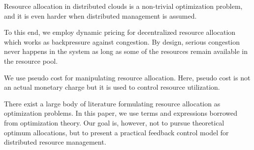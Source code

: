 Resource allocation in distributed clouds is a non-trivial
optimization problem, and it is even harder when distributed
management is assumed.

To this end, we employ dynamic pricing for decentralized resource
allocation which works as backpressure against congestion.
By design, serious congestion never happens in the system as long as
some of the resources remain available in the resource pool.

We use pseudo cost for manipulating resource allocation.
Here, pseudo cost is not an actual monetary charge but it is used to
control resource utilization.

There exist a large body of literature formulating resource allocation
as optimization problems.
In this paper, we use terms and expressions borrowed from optimization
theory. Our goal is, however, not to pursue theoretical optimum
allocations, but to present a practical feedback control model for
distributed resource management.



